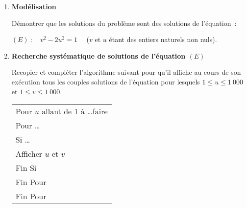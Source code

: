      \begin{enumerate}
          \item \textbf{Modélisation}
          \par
          Démontrer que les solutions du problème sont des solutions de l'équation~:
\begin{center}
         $(E)~:\quad  v^2 - 2u^2 = 1\quad$  ($v$  et $u$ étant des entiers naturels non nuls).
\end{center}
          \item  \textbf{Recherche systématique de solutions de l'équation $(E)$}
          \par
          Recopier et compléter l'algorithme suivant pour qu'il affiche au cours de son exécution tous les couples solutions de l'équation pour lesquels $1 \leqslant u \leqslant 1~000$ et $1 \leqslant v \leqslant 1~000$.
          \begin{center}
\begin{extern}%
               \begin{tabular}{|l|}\hline
                    Pour $u$ allant de 1 à \ldots faire\\
                    \hspace{0.5cm}Pour \ldots\\
                    \hspace{1cm}Si \ldots\\
                    \hspace{1.5cm}Afficher $u$ et $v$\\
                    \hspace{1cm}Fin Si\\
                    \hspace{0.5cm}Fin Pour\\
                    Fin Pour\\ \hline
               \end{tabular}
\end{extern}


\end{center}
\end{enumerate}

